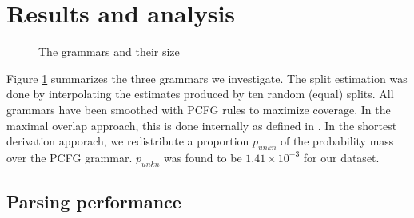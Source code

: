 \section{Results and analysis}\label{sec:Results}
\begin{figure}[h!]
\caption{The grammars and their size}
\label{f:grammars}
\end{figure}

Figure \ref{f:grammars} summarizes the three grammars we investigate.
The split estimation was done by interpolating the estimates produced by ten random (equal) splits.  All grammars have been smoothed with PCFG rules to maximize coverage. In the maximal overlap approach, this is done internally as defined in \ddop{}. In the shortest derivation apporach, we redistribute a proportion $p_{unkn}$ of the probability mass over the PCFG grammar. $p_{unkn}$ was found to be $1.41\times 10^{-3}$ for our dataset.%


\subsection{Parsing performance}

\begin{table}
\center

\label{t:performance}
\end{table}

